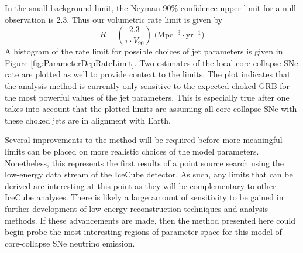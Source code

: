 \documentclass{gatech-thesis}
\begin{document}
In the small background limit, the Neyman 90$\%$ confidence upper limit for a null observation is 2.3. Thus our volumetric rate limit is given by
\begin{equation}
R = \left(\frac{2.3}{\tau \cdot V_{90}}\right) \; \text{(Mpc$^{-3} \cdot$yr$^{-1}$)}
\end{equation}
A histogram of the rate limit for possible choices of jet parameters is given in Figure \ref{fig:ParameterDepRateLimit}. Two estimates of the local core-collapse SNe rate are plotted as well to provide context to the limits. The plot indicates that the analysis method is currently only sensitive to the expected choked GRB for the most powerful values of the jet parameters. This is especially true after one takes into account that the plotted limits are assuming all core-collapse SNe with these choked jets are in alignment with Earth. 

Several improvements to the method will be required before more meaningful limits can be placed on more realistic choices of the model parameters. Nonetheless, this represents the first results of a point source search using the low-energy data stream of the IceCube detector. As such, any limits that can be derived are interesting at this point as they will be complementary to other IceCube analyses. There is likely a large amount of sensitivity to be gained in further development of low-energy reconstruction techniques and analysis methods. If these advancements are made, then the method presented here could begin probe the most interesting regions of parameter space for this model of core-collapse SNe neutrino emission.
\end{document}
